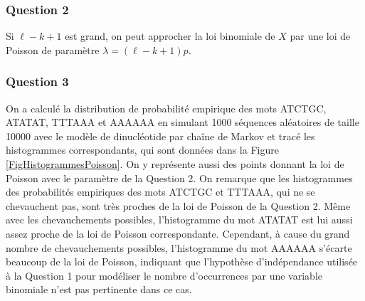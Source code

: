 \documentclass[a4paper,12pt]{article}
\begin{document}
\subsubsection*{Question 2}

Si $\ell - k + 1$ est grand, on peut approcher la loi binomiale de $X$ par une loi de Poisson de paramètre $\lambda = (\ell - k + 1) p$.

\subsubsection*{Question 3}

On a calculé la distribution de probabilité empirique des mots ATCTGC, ATATAT, TTTAAA et AAAAAA en simulant 1000 séquences aléatoires de taille 10000 avec le modèle de dinucléotide par chaîne de Markov et tracé les histogrammes correspondants, qui sont données dans la Figure \ref{FigHistogrammesPoisson}. On y représente aussi des points donnant la loi de Poisson avec le paramètre de la Question 2. On remarque que les histogrammes des probabilités empiriques des mots ATCTGC et TTTAAA, qui ne se chevauchent pas, sont très proches de la loi de Poisson de la Question 2. Même avec les chevauchements possibles, l'histogramme du mot ATATAT est lui aussi assez proche de la loi de Poisson correspondante. Cependant, à cause du grand nombre de chevauchements possibles, l'histogramme du mot AAAAAA s'écarte beaucoup de la loi de Poisson, indiquant que l'hypothèse d'indépendance utilisée à la Question 1 pour modéliser le nombre d'occurrences par une variable binomiale n'est pas pertinente dans ce cas.
\end{document}
